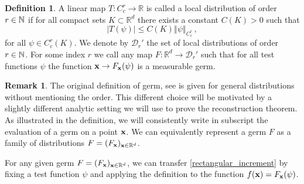 \documentclass[12pt]{article}
\numberwithin{equation}{section}
\theoremstyle{plain}
\theoremstyle{definition}
\newtheorem{definition}[theorem]{Definition}
\newtheorem{remark}[theorem]{Remark}
\newcommand{\abs}[1]{\left\vert #1 \right\vert}
\newcommand{\norm}[1]{\left\Vert #1\right\Vert}
\newcommand{\R}{\ensuremath{{\mathbb R}}}
\def\bR{\mathbb{R}}\def\bS{\mathbb{S}}
\begin{document}
\begin{definition}
    A linear map $T:C_c^r \to \bR$ is called a local distribution of order $r\in \mathbb{N}$ if for all compact sets $ K\subset \R^d$ there exists a constant $C(K) > 0$ such that
    \[\abs{T(\psi)}\le C(K) \norm{\psi}_{C^r_c}\,,\]
    for all $\psi\in C^r_c(K)$. We denote by $\mathcal{D}_r'$ the set of local distributions of order $r\in \mathbb{N}$. For some index $r$ we call any map $F\colon \R^d\to \mathcal{D}_r'$ such that for all test functions $\psi$ the function $\mathbf x\to F_{\mathbf x}(\psi)$ is a measurable germ.%
    



\end{definition}

\begin{remark}
The original definition of germ, see \cite[Definition 4.1]{zambotti2020} is given for general distributions without mentioning the order. This different choice will be motivated by a slightly different analytic setting we will use to prove the reconstruction theorem. As illustrated in the definition, we will consistently write in subscript the evaluation of a germ on a point $\mathbf x$. We can equivalently represent a germ $F$ as a family of distributions $F=(F_{\fx})_{\fx\in\R^d}$.
\end{remark}

 For any given germ $F=(F_{\fx})_{\fx\in\R^d}$, we can transfer \eqref{rectangular_increment} by fixing a test function $\psi$ and applying the definition to the function $f(\mathbf x)=F_{\mathbf x}(\psi)$.
\end{document}
